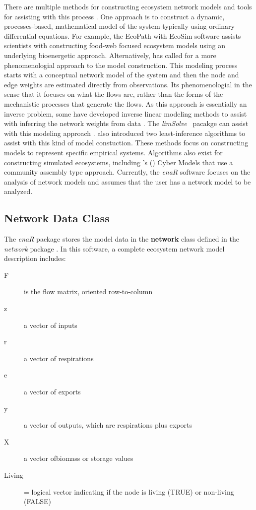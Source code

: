 \documentclass[article]{jss}
\newcommand{\R}{\proglang{R}}
\def\citeapos#1{\citeauthor{#1}'s (\citeyear{#1})}
\begin{document}
There are multiple methods for constructing ecosystem network models
and tools for assisting with this process
\citep{fath07_netconstruction}.  One approach is to construct a
dynamic, processes-based, mathematical model of the system typically
using ordinary differential equations.  For example, the EcoPath with
EcoSim \citep{christensen92, christensen95} software assists
scientists with constructing food-web focused ecosystem models using
an underlying bioenergetic approach.  Alternatively,
\citet{ulanowicz86} has called for a more phenomenologial approach to
the model construction.  This modeling process starts with a
conceptual network model of the system and then the node and edge
weights are estimated directly from observations.  Its phenomenologial
in the sense that it focuses on what the flows are, rather than the
forms of the mechanistic processes that generate the flows.  As this
approach is essentially an inverse problem, some have developed
inverse linear modeling methods to assist with inferring the network
weights from data \citep{vezina1988, vanoevelen2010}.  The
\textit{limSolve} \R\ pacakge can assist with this modeling approach
\citep{soetaert09}.  \citet{ulanowicz2008least} also introduced two
least-inference algorithms to assist with this kind of model
constuction.  These methods focus on constructing models to represent
specific empirical systems.  Algorithms also exist for constructing
simulated ecosystems, including \citeapos{fath04_cyber} Cyber Models
that use a community assembly type approach. Currently, the
\textit{enaR} software focuses on the analysis of network models and
assumes that the user has a network model to be analyzed.

\subsection{Network Data Class}

The \textit{enaR} package stores the model data in the
\textbf{network} class defined in the \textit{network} package
\citep[see][for details]{butts08_network}. In this software, a
complete ecosystem network model description includes:

\begin{description}
\item[F] is the flow matrix, oriented row-to-column
\item[z] a vector of inputs
\item[r] a vector of respirations
\item[e] a vector of exports
\item[y] a vector of outputs, which are respirations plus exports
\item[X] a vector ofbiomass or storage values
\item[Living] = logical vector indicating if the node is living
  (TRUE) or non-living (FALSE)
\end{description}
\end{document}
